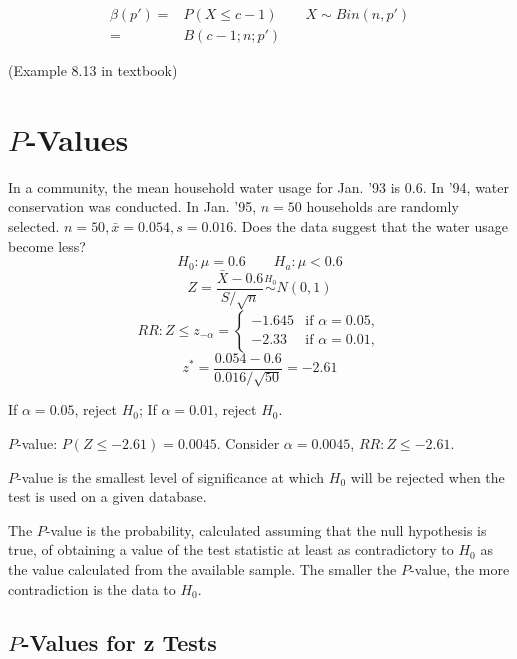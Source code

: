 \begin{align*}
\beta(p')= & P(X \leq c-1) \qquad X \sim Bin(n,p') \\
= & B(c-1;n;p')
\end{align*}

\begin{exmp}
(Example 8.13 in textbook)
\end{exmp}

\section{$P$-Values}
\begin{exmp}
In a community, the mean household water usage for Jan. '93 is 0.6. In '94, water conservation was conducted. In Jan. '95, $n=50$ households are randomly selected. $n=50,\bar{x}=0.054,s=0.016$. Does the data suggest that the water usage become less?
\[H_0:\mu=0.6 \qquad H_a:\mu<0.6\]
\[Z=\frac{\bar{X}-0.6}{S/\sqrt{n}}\overset{H_0}{\sim} N(0,1)\]
\[RR: Z\leq z_{-\alpha}=\begin{cases}
-1.645 &\text{if }\alpha=0.05, \\
-2.33 &\text{if }\alpha=0.01, 
\end{cases}\]
\[z^*=\frac{0.054-0.6}{0.016/\sqrt{50}}=-2.61\]

If $\alpha=0.05$, reject $H_0$; If $\alpha=0.01$, reject $H_0$.

$P$-value: $P(Z\leq-2.61)=0.0045$. Consider $\alpha=0.0045$, $RR:Z\leq-2.61$.
\end{exmp}

\begin{defn}
$P$-value is the smallest level of significance at which $H_0$ will be rejected when the test is used on a given database.
\end{defn}

\noindent{}

\begin{defn}
The $P$-value is the probability, calculated assuming that the null hypothesis is true, of obtaining a value of the test statistic at least as contradictory to $H_0$ as the value calculated from the available sample. The smaller the $P$-value, the more contradiction is the data to $H_0$.
\end{defn}

\subsection{$P$-Values for z Tests}
